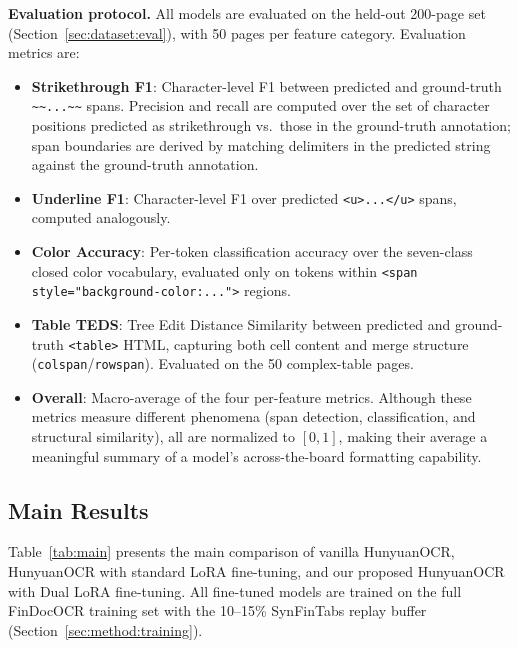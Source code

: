 \documentclass[10pt,twocolumn]{article}
\begin{document}
\textbf{Evaluation protocol.} All models are evaluated on the held-out 200-page
set (Section~\ref{sec:dataset:eval}), with 50 pages per feature category.
Evaluation metrics are:

\begin{itemize}
  \item \textbf{Strikethrough F1}: Character-level F1 between predicted and
    ground-truth
    \texttt{\textasciitilde\textasciitilde...\textasciitilde\textasciitilde}
    spans. Precision and recall are computed over the set of character positions
    predicted as strikethrough vs.\ those in the ground-truth annotation; span
    boundaries are derived by matching delimiters in the predicted string against
    the ground-truth annotation.
  \item \textbf{Underline F1}: Character-level F1 over predicted
    \texttt{<u>...</u>} spans, computed analogously.
  \item \textbf{Color Accuracy}: Per-token classification accuracy over the
    seven-class closed color vocabulary, evaluated only on tokens within
    \texttt{<span style="background-color:...">} regions.
  \item \textbf{Table TEDS}: Tree Edit Distance Similarity \cite{zhong2020teds}
    between predicted and ground-truth \texttt{<table>} HTML, capturing both cell
    content and merge structure (\texttt{colspan}/\texttt{rowspan}). Evaluated on
    the 50 complex-table pages.
  \item \textbf{Overall}: Macro-average of the four per-feature metrics. Although
    these metrics measure different phenomena (span detection, classification, and
    structural similarity), all are normalized to $[0,1]$, making their average a
    meaningful summary of a model's across-the-board formatting capability.
\end{itemize}

\subsection{Main Results}
\label{sec:experiments:results}

Table~\ref{tab:main} presents the main comparison of vanilla HunyuanOCR,
HunyuanOCR with standard LoRA fine-tuning, and our proposed HunyuanOCR with Dual
LoRA fine-tuning. All fine-tuned models are trained on the full FinDocOCR
training set with the 10--15\% SynFinTabs replay buffer
(Section~\ref{sec:method:training}).
\end{document}
